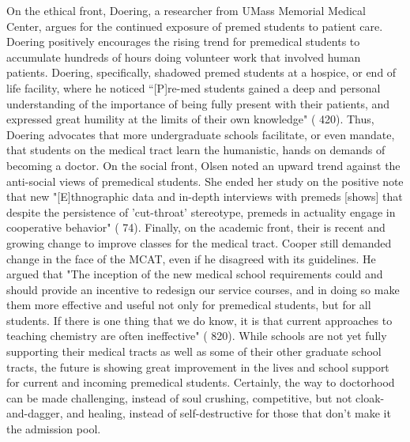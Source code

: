 \documentclass [12pt]{article}
\begin{document}
\begin{flushleft}
On the ethical front, Doering, a researcher from UMass Memorial Medical Center, argues for the continued exposure of premed students to patient care. Doering positively encourages the rising trend for premedical students to accumulate hundreds of hours doing volunteer work that involved human patients. Doering, specifically, shadowed premed students at a hospice, or end of life facility, where he noticed {``}[P]re-med students gained a deep and personal understanding of the importance of being fully present with their patients, and expressed great humility at the limits of their own knowledge" (\cite{Doering-2015} 420). Thus, Doering advocates that more undergraduate schools facilitate, or even mandate, that students on the medical tract learn the humanistic, hands on demands of becoming a doctor. On the social front, Olsen noted an upward trend against the anti-social views of premedical students. She ended her study on the positive note that new "[E]thnographic data and in-depth interviews with premeds [shows] that despite the persistence of 'cut-throat' stereotype, premeds in actuality engage in cooperative behavior" (\cite{Olsen-2016} 74). Finally, on the academic front, their is recent and growing change to improve classes for the medical tract. Cooper still demanded change in the face of the MCAT, even if he disagreed with its guidelines. He argued that "The inception of the new medical school requirements could and should provide an incentive to redesign our service courses, and in doing so make them more effective and useful not only for premedical students, but for all students. If there is one thing that we do know, it is that current approaches to teaching chemistry are often ineffective" (\cite{Cooper-2013} 820). While schools are not yet fully supporting their medical tracts as well as some of their other graduate school tracts, the future is showing great improvement in the lives and school support for current and incoming premedical students. Certainly, the way to doctorhood can be made challenging, instead of soul crushing, competitive, but not cloak-and-dagger, and healing, instead of self-destructive for those that don't make it the admission pool. 
\newpage
\medskip %
\nocite{*} %
\printbibliography%
\end{flushleft}
\end{document}
